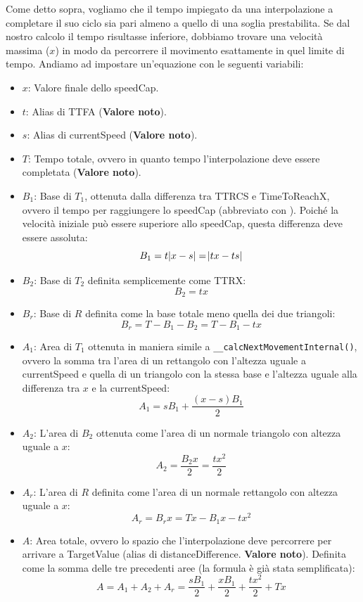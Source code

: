 \documentclass[main.tex]{subfiles}
\begin{document}
\noindent Come detto sopra, vogliamo che il tempo impiegato da una interpolazione a completare il suo ciclo sia pari almeno a quello di una soglia prestabilita. Se dal nostro calcolo il tempo risultasse inferiore, dobbiamo trovare una velocità massima ($x$) in modo da percorrere il movimento esattamente in quel limite di tempo. Andiamo ad impostare un'equazione con le seguenti variabili:
\begin{itemize}
    \item $x$: Valore finale dello speedCap.
    \item $t$: Alias di TTFA (\textbf{Valore noto}).
    \item $s$: Alias di currentSpeed (\textbf{Valore noto}).
    \item $T$: Tempo totale, ovvero in quanto tempo l'interpolazione deve essere completata (\textbf{Valore noto}).
    \item $B_1$: Base di $T_1$, ottenuta dalla differenza tra TTRCS e TimeToReachX, ovvero il tempo per raggiungere lo speedCap (abbreviato con ). Poiché la velocità iniziale può essere superiore allo speedCap, questa differenza deve essere assoluta: \[B_1 = t\abs{x - s} = \abs{tx - ts}\]
    \item $B_2$: Base di $T_2$ definita semplicemente come TTRX: \[B_2 = tx\]
    \item $B_r$: Base di $R$ definita come la base totale meno quella dei due triangoli: \[B_r = T - B_1 - B_2 = T - B_1 - tx\]
    \item $A_1$: Area di $T_1$ ottenuta in maniera simile a \lstinline{__calcNextMovementInternal()}, ovvero la somma tra l'area di un rettangolo con l'altezza uguale a currentSpeed e quella di un triangolo con la stessa base e l'altezza uguale alla differenza tra $x$ e la currentSpeed: \[A_1 = sB_1 + \frac{(x - s)B_1}{2}\]
    \item $A_2$: L'area di $B_2$ ottenuta come l'area di un normale triangolo con altezza uguale a $x$: \[A_2 = \frac{B_2x}{2} = \frac{tx^2}{2}\]
    \item $A_r$: L'area di $R$ definita come l'area di un normale rettangolo con altezza uguale a $x$: \[A_r = B_rx = Tx - B_1x - tx^2\]
    \item $A$: Area totale, ovvero lo spazio che l'interpolazione deve percorrere per arrivare a TargetValue (alias di distanceDifference. \textbf{Valore noto}). Definita come la somma delle tre precedenti aree (la formula è già stata semplificata): \[A = A_1 + A_2 + A_r = \frac{sB_1}{2} + \frac{xB_1}{2} + \frac{tx^2}{2} + Tx\]
\end{itemize}
\end{document}
